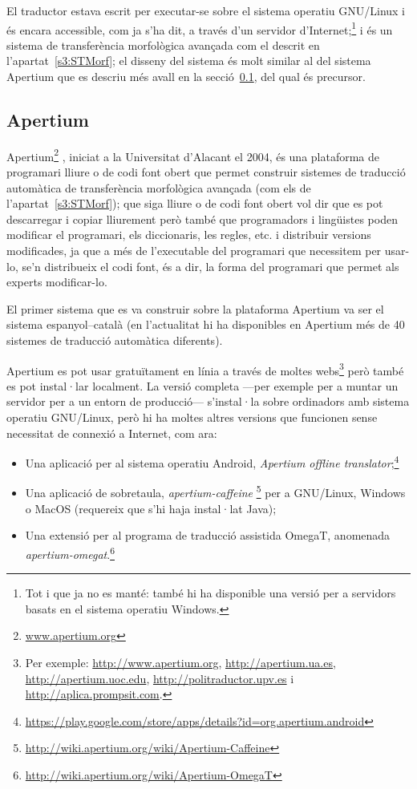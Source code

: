 El traductor estava escrit per executar-se sobre el sistema operatiu
GNU/\-Linux i és encara accessible, com ja s'ha dit, a través d'un
servidor d'Internet;\footnote{Tot i que ja no es manté: també hi ha
  disponible una versió per a servidors basats en el sistema operatiu
  Windows.} i és un sistema de transferència morfològica avançada com
el descrit en l'apartat~\ref{s3:STMorf}; el disseny del sistema és
molt similar al del sistema Apertium que es descriu més avall en la
secció~\ref{ss:apertium}, del qual és precursor.

\subsection{Apertium}
\label{ss:apertium}

Apertium\footnote{\url{www.apertium.org}} \citep{forcada2011apertium},
iniciat a la Universitat d'Alacant el 2004, és una plataforma de
programari lliure o de codi font obert que permet construir sistemes
de traducció automàtica de transferència morfològica avançada (com els
de l'apartat~\ref{s3:STMorf}); que siga lliure o de codi font obert vol dir que es pot descarregar i
copiar lliurement però també que programadors i lingüistes poden
modificar el programari, els diccionaris, les regles, etc. i
distribuir versions modificades, ja que a més de l'executable del
programari que necessitem per usar-lo, se'n distribueix el codi font,
és a dir, la forma del programari que permet als experts modificar-lo.

El primer sistema que es va construir sobre la plataforma Apertium va
ser el sistema espanyol--català (en l'actualitat hi ha disponibles en
Apertium més de 40 sistemes de traducció automàtica diferents).

Apertium es pot usar gratuïtament en línia a través de moltes
webs\footnote{Per exemple: \url{http://www.apertium.org},
  \url{http://apertium.ua.es}, \url{http://apertium.uoc.edu},
  \url{http://politraductor.upv.es} i
  \url{http://aplica.prompsit.com}.} però també es pot instal·lar 
localment. La versió completa ---per exemple per a muntar un servidor
per a un entorn de producció--- s'instal·la sobre ordinadors amb sistema
operatiu GNU/Linux, però hi ha moltes altres versions que funcionen sense necessitat de connexió a Internet, com ara:
\begin{itemize}
\item Una aplicació per al sistema operatiu Android, \emph{Apertium
    offline
    translator};\footnote{\url{https://play.google.com/store/apps/details?id=org.apertium.android}}
\item Una aplicació de sobretaula, \emph{apertium-caffeine}
  \footnote{\url{http://wiki.apertium.org/wiki/Apertium-Caffeine}} per
  a GNU/Linux, Windows o MacOS (requereix que s'hi haja instal·lat
  Java);
\item Una extensió per al programa de traducció assistida OmegaT, anomenada \emph{apertium-omegat}.\footnote{\url{http://wiki.apertium.org/wiki/Apertium-OmegaT}}
\end{itemize}




